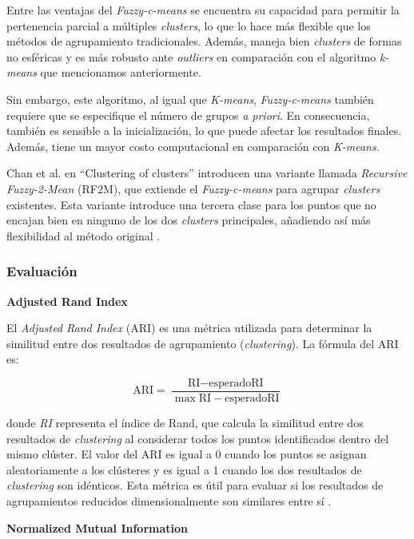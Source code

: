 \documentclass[11pt,a4paper,twoside,openany]{tesis}
\begin{document}
Entre las ventajas del \emph{Fuzzy-c-means} se encuentra su capacidad para permitir la pertenencia parcial a múltiples \emph{clusters}, lo que lo hace más flexible que los métodos de agrupamiento tradicionales. Además, maneja bien \emph{clusters} de formas no esféricas y es más robusto ante \emph{outliers} en comparación con el algoritmo \emph{k-means} que mencionamos anteriormente.

Sin embargo, este algoritmo, al igual que \emph{K-means},  \emph{Fuzzy-c-means} también requiere que se especifique el número de grupos \emph{a priori}. En consecuencia, también es sensible a la inicialización, lo que puede afectar los resultados finales. Además, tiene un mayor costo computacional en comparación con \emph{K-means}.

Chan et al. en ``Clustering of clusters'' introducen una variante llamada \emph{Recursive Fuzzy-2-Mean} (RF2M), que extiende el \emph{Fuzzy-c-means} para agrupar \emph{clusters} existentes. Esta variante introduce una tercera clase para los puntos que no encajan bien en ninguno de los dos \emph{clusters} principales, añadiendo así más flexibilidad al método original \cite{fuzzy-k-means}.


\subsubsection{Evaluación} \textbf{ }

\textbf{Adjusted Rand Index}

El \textit{Adjusted Rand Index} (ARI) es una métrica utilizada para determinar la similitud entre dos resultados de agrupamiento (\emph{clustering}). La fórmula del ARI es:

\begin{equation}
\text{ARI} = \frac{\text{RI} - \text{esperadoRI}}{\max \text{RI} - \text{esperadoRI}}
\end{equation}

donde \textit{RI} representa el índice de Rand, que calcula la similitud entre dos resultados de \emph{clustering} al considerar todos los puntos identificados dentro del mismo clúster. El valor del ARI es igual a 0 cuando los puntos se asignan aleatoriamente a los clústeres y es igual a 1 cuando los dos resultados de \emph{clustering} son idénticos. Esta métrica es útil para evaluar si los resultados de agrupamientos reducidos dimensionalmente son similares entre sí \cite{ari}.

\textbf{Normalized Mutual Information}
\end{document}
